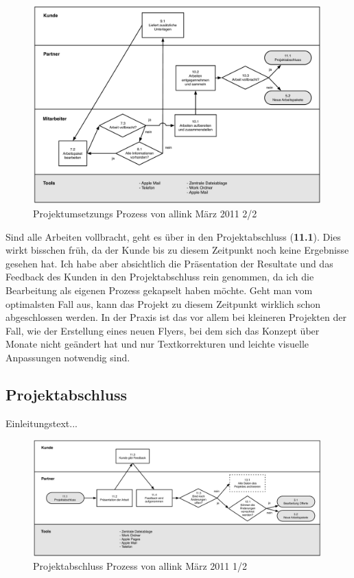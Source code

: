 \begin{figure}[htbp]
\begin{center}
\includegraphics[width=0.99\textwidth,angle=0]{./bilder/02_ist_prozesse_arbeit_02.pdf}
\caption{Projektumsetzungs Prozess von allink März 2011 2/2}
\label{pic:02_ist_prozesse_arbeit_02}
\end{center}
\end{figure}

Sind alle Arbeiten vollbracht, geht es über in den Projektabschluss (\textbf{11.1}). Dies wirkt
bisschen früh, da der Kunde bis zu diesem Zeitpunkt noch keine Ergebnisse gesehen
hat. Ich habe aber absichtlich die Präsentation der Resultate und das Feedback
des Kunden in den Projektabschluss rein genommen, da ich die Bearbeitung als eigenen
Prozess gekapselt haben möchte. Geht man vom optimalsten Fall aus, kann das
Projekt zu diesem Zeitpunkt wirklich schon abgeschlossen werden. In der Praxis
ist das vor allem bei kleineren Projekten der Fall, wie der Erstellung eines
neuen Flyers, bei dem sich das Konzept über Monate nicht geändert hat und nur
Textkorrekturen und leichte visuelle Anpassungen notwendig sind.

\clearpage

\subsection{Projektabschluss}
Einleitungstext...

\begin{figure}[htbp]
\begin{center}
\includegraphics[width=0.99\textwidth,angle=0]{./bilder/03_ist_prozesse_abschluss_01.pdf}
\caption{Projektabschluss Prozess von allink März 2011 1/2}
\label{pic:03_ist_prozesse_abschluss_01}
\end{center}
\end{figure}

